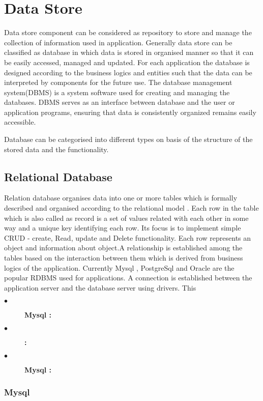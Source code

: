 \chapter{Data Store}\label{ch:ch6label}

			Data store component can be considered as repository to store and manage the collection of information used in application. Generally data store can be classified as database in which data is stored in organised manner so that it can be easily accessed, managed and updated. For each application the database is designed according to the business logics and entities such that the data can be interpreted by components for the future use. The database management system(DBMS) is a system software used for creating and managing the databases. DBMS serves as an interface between database and the user or application programs, ensuring that data is consistently organized remains easily accessible. 
			
			Database can be categorised into different types on basis of the  structure of the stored data and the functionality.

\section{Relational Database} 
                 Relation database organises data into one or more tables which is formally described and organised according to the relational model . Each row in the table which is also called as record is a set of values related with each other in some way and a unique key identifying each row. Its focus is to implement simple CRUD - create, Read, update and Delete functionality. Each row represents an object and information about object.A relationship is established among the tables based on the interaction between them  which is derived from business logics of the application. Currently Mysql , PostgreSql and Oracle are the popular RDBMS used for applications.  A connection is established between the application server and the database server using drivers. This    
                  
\begin{description}
  \item[$\bullet$] {\bfseries Mysql :}
  \item[$\bullet$] {\bfseries  :}
  \item[$\bullet$] {\bfseries Mysql :}
\end{description}  
                 
\subsection{Mysql}

